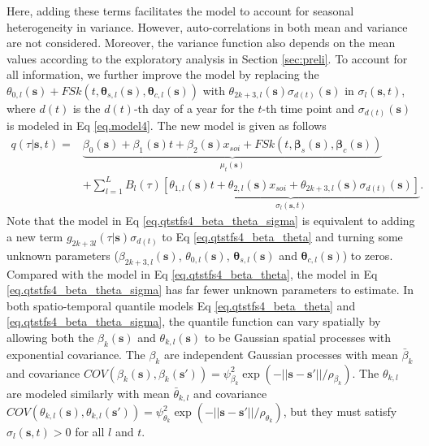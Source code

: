 \documentclass[fleqn,10pt]{wlscirep}
\newcommand{\bs}{\mathbf{s}}
\newcommand{\qtst}{q(\tau | \bs, t)}
\begin{document}
Here, adding these terms facilitates the model to account for seasonal heterogeneity in variance. However, auto-correlations in both mean and variance are not considered. Moreover, the variance function also depends on the mean values according to the exploratory analysis in Section \ref{sec:preli}. To account for all information, we further improve the model by replacing the  $\theta_{0,l}(\bs) +FSk(t,\boldsymbol{\theta}_{s,l}(\bs),\boldsymbol{\theta}_{c,l}(\bs))$ with $\theta_{2k+3,l}(\bs)\sigma_{d(t)}(\bs)$ in $\sigma_l(\bs,t)$, where $d(t)$ is the $d(t)$-th day of a year for the $t$-th time point and $\sigma_{d(t)}(\bs)$ is modeled in Eq \eqref{eq.model4}. The new model is given as follows
\begin{equation}\label{eq.qtstfs4_beta_theta_sigma}
	\begin{split}
		\qtst=&\underbrace{\beta_0( \bs)+ \beta_1(\bs)t + \beta_2(\bs) x_{soi} + FSk(t,\boldsymbol{\beta}_s(\bs),\boldsymbol{\beta}_c(\bs))}_{\mu_t(\bs)}   \\
		&+\sum_{l=1}^{L}B_l(\tau) \underbrace{\left[\theta_{1,l}(\bs)t + \theta_{2,l}(\bs)x_{soi} + \theta_{2k+3,l}(\bs)\sigma_{d(t)}(\bs) \right]}_{\sigma_l(\bs,t)}.
	\end{split}
\end{equation}
Note that the model in Eq \eqref{eq.qtstfs4_beta_theta_sigma} is equivalent to adding a new term $g_{2k+3l}(\tau|\bs)\sigma_{d(t)}$ to Eq \eqref{eq.qtstfs4_beta_theta} and turning some unknown parameters ($\beta_{2k+3,l}(\bs)$, $\theta_{0,l}(\bs)$, $\boldsymbol{\theta}_{s,l}(\bs)$ and $\boldsymbol{\theta}_{c,l}(\bs)$) to zeros. Compared with the model in Eq \eqref{eq.qtstfs4_beta_theta}, the model in Eq \eqref{eq.qtstfs4_beta_theta_sigma} has far fewer unknown parameters to estimate.  In both spatio-temporal quantile models Eq \eqref{eq.qtstfs4_beta_theta} and \eqref{eq.qtstfs4_beta_theta_sigma}, the quantile function can vary spatially by allowing both the $\beta_k(\bs)$ and $\theta_{k,l}(\bs)$ to be Gaussian spatial processes with exponential covariance. The $\beta_k$ are independent Gaussian processes with mean $\bar{\beta}_k$ and covariance $COV(\beta_k(\bs),\beta_k(\bs'))= \psi_{\beta_k}^2\exp(-||\bs-\bs'||/\rho_{\beta_k})$. The $\theta_{k,l}$ are modeled similarly with mean $\bar{\theta}_{k,l}$ and covariance $COV(\theta_{k,l}(\bs),\theta_{k,l}(\bs'))= \psi_{\theta_k}^2\exp(-||\bs-\bs'||/\rho_{\theta_k})$, but they must satisfy $\sigma_l(\bs,t)>0$ for all $l$ and $t$.
\end{document}
